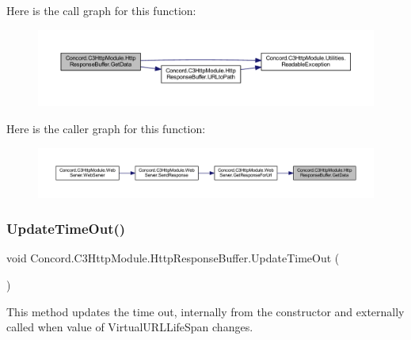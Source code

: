 Here is the call graph for this function\+:
\nopagebreak
\begin{figure}[H]
\begin{center}
\leavevmode
\includegraphics[width=350pt]{class_concord_1_1_c3_http_module_1_1_http_response_buffer_a78e479ce9315db0f118145e814926b48_cgraph}
\end{center}
\end{figure}
Here is the caller graph for this function\+:
\nopagebreak
\begin{figure}[H]
\begin{center}
\leavevmode
\includegraphics[width=350pt]{class_concord_1_1_c3_http_module_1_1_http_response_buffer_a78e479ce9315db0f118145e814926b48_icgraph}
\end{center}
\end{figure}
\mbox{\label{class_concord_1_1_c3_http_module_1_1_http_response_buffer_a29b2c2d2262cb331fe0f18e1dd930b5e}} 
\subsubsection{\texorpdfstring{UpdateTimeOut()}{UpdateTimeOut()}}
{\footnotesize\ttfamily void Concord.\+C3\+Http\+Module.\+Http\+Response\+Buffer.\+Update\+Time\+Out (\begin{DoxyParamCaption}{ }\end{DoxyParamCaption})\hspace{0.3cm}{\ttfamily [inline]}}



This method updates the time out, internally from the constructor and externally called when value of Virtual\+U\+R\+L\+Life\+Span changes. 



